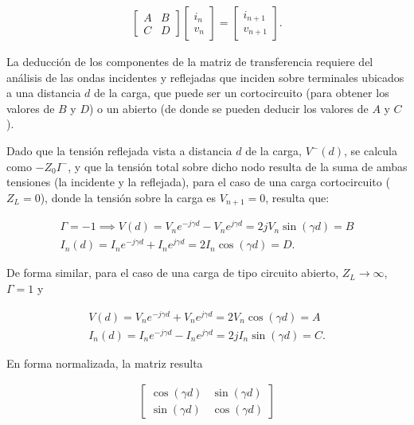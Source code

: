 \begin{align}
\begin{bmatrix}
A & B \\
C & D
\end{bmatrix}
\begin{bmatrix}
i_n \\
v_n
\end{bmatrix}
=
\begin{bmatrix}
i_{n+1} \\
v_{n+1}
\end{bmatrix}.
\end{align}

La deducción de los componentes de la matriz de transferencia requiere del análisis de las ondas incidentes y reflejadas que inciden sobre terminales ubicados a una distancia $d$ de la carga, que puede ser un cortocircuito (para obtener los valores de $B$ y $D$) o un abierto (de donde se pueden deducir los valores de $A$ y $C$).

Dado que la tensión reflejada vista a distancia $d$ de la carga, $V^{-}(d)$, se calcula como $-Z_0 I^{-}$, y que la tensión total sobre dicho nodo resulta de la suma de ambas tensiones (la incidente y la reflejada), para el caso de una carga cortocircuito ($Z_L = 0$), donde la tensión sobre la carga es $V_{n+1} = 0$, resulta que:

\begin{align}
	\Gamma = -1 \implies V(d) = V_n e^{-j\gamma d} - V_n e^{j\gamma d} = 2 j V_n \sin(\gamma d) = B \\
	I_n (d) = I_n e^{-j\gamma d} + I_n e^{j\gamma d} = 2 I_n \cos(\gamma d) = D.
\end{align}

De forma similar, para el caso de una carga de tipo circuito abierto, $Z_L \rightarrow \infty$, $\Gamma = 1$ y

\begin{align}
V(d) = V_n e^{-j\gamma d} + V_n e^{j\gamma d} = 2 V_n \cos(\gamma d) = A \\
I_n (d) = I_n e^{-j\gamma d} - I_n e^{j\gamma d} = 2 j I_n \sin(\gamma d) = C.
\end{align}

En forma normalizada, la matriz resulta \cite{Pozar:MwEngineering}

\begin{align}
\label{eq:matriz_transferencia_lineaideal}
\begin{bmatrix}
\cos(\gamma d) & \sin(\gamma d) \\
\sin(\gamma d) & \cos(\gamma d)
\end{bmatrix}
\end{align}


